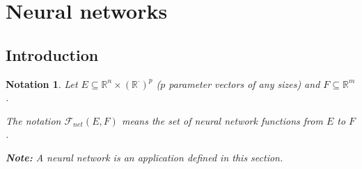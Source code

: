 \documentclass[11pt,en]{elegantpaper}
\newtheorem{notation}{Notation}
\newcommand{\Real}{\mathbb{R}}
\begin{document}
\section{Neural networks}

\subsection{Introduction}

\begin{notation}
  Let $E \subseteq \Real^n \times (\Real^{\cdot})^p$ ($p$ parameter vectors of any sizes) and $F \subseteq \Real^m$. \par
  The notation $\mathcal{F}_{net}(E,F)$ means the set of neural network functions from $E$ to $F$. \par
  \textbf{Note:} A neural network is an application defined in this section. \par
\end{notation}
\end{document}
